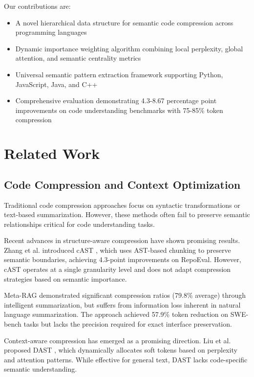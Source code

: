 \documentclass[conference]{IEEEtran}
\begin{document}
Our contributions are:
\begin{itemize}
    \item A novel hierarchical data structure for semantic code compression across programming languages
    \item Dynamic importance weighting algorithm combining local perplexity, global attention, and semantic centrality metrics
    \item Universal semantic pattern extraction framework supporting Python, JavaScript, Java, and C++
    \item Comprehensive evaluation demonstrating 4.3-8.67 percentage point improvements on code understanding benchmarks with 75-85\% token compression
\end{itemize}

\section{Related Work}

\subsection{Code Compression and Context Optimization}

Traditional code compression approaches focus on syntactic transformations or text-based summarization. However, these methods often fail to preserve semantic relationships critical for code understanding tasks.

Recent advances in structure-aware compression have shown promising results. Zhang et al. introduced cAST \cite{zhang2024cast}, which uses AST-based chunking to preserve semantic boundaries, achieving 4.3-point improvements on RepoEval. However, cAST operates at a single granularity level and does not adapt compression strategies based on semantic importance.

Meta-RAG \cite{tawosi2024metarag} demonstrated significant compression ratios (79.8\% average) through intelligent summarization, but suffers from information loss inherent in natural language summarization. The approach achieved 57.9\% token reduction on SWE-bench tasks but lacks the precision required for exact interface preservation.

Context-aware compression has emerged as a promising direction. Liu et al. proposed DAST \cite{liu2025dast}, which dynamically allocates soft tokens based on perplexity and attention patterns. While effective for general text, DAST lacks code-specific semantic understanding.
\end{document}
